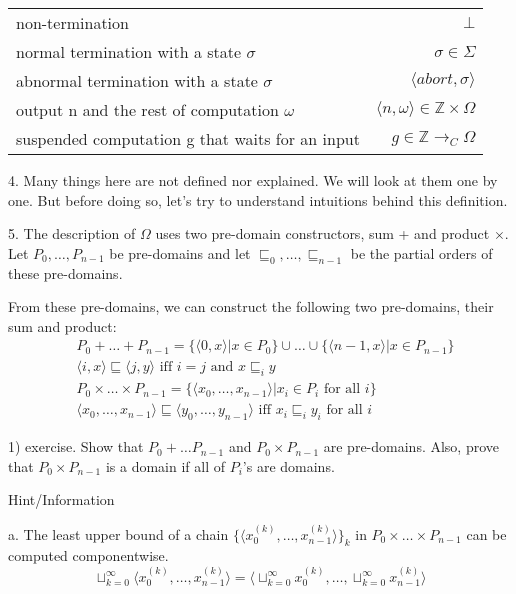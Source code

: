 \documentclass{report}[12pt]
\begin{document}
\begin{tabular}{l@{$\cdots$}r}
  non-termination & $\bot$ \\
  normal termination with a state $\sigma$  & $\sigma \in \Sigma$ \\
  abnormal termination with a state $\sigma$ & $\langle abort, \sigma \rangle$ \\
  output n and the rest of computation $\omega$ & $\langle n, \omega \rangle \in \mathbb{Z} \times \Omega$ \\
  suspended computation g that waits for an input & $g \in \mathbb{Z} \rightarrow_C \Omega$
\end{tabular}

4. Many things here are not defined nor explained. We will look at them one by one. But before doing so, let's try to understand intuitions behind this definition.

5. The description of $\Omega$ uses two pre-domain constructors, sum + and product $\times$. Let $P_0, \ldots, P_{n-1}$ be pre-domains and let $\sqsubseteq_0, \ldots, \sqsubseteq_{n-1}$ be the partial orders of these pre-domains.

From these pre-domains, we can construct the following two pre-domains, their sum and product:
\begin{align*}
  &P_0 + \ldots + P_{n-1} = \{\langle 0, x \rangle|x\in P_0\} \cup \ldots \cup \{\langle n-1, x \rangle | x \in P_{n-1}\} \\
  &\langle i, x \rangle \sqsubseteq \langle j, y \rangle \text{ iff }i=j \text{ and }x\sqsubseteq_i y \\
  &P_0 \times \ldots \times P_{n-1} = \{\langle x_0, \ldots, x_{n-1} \rangle | x_i \in P_i \text{ for all } i\} \\
  &\langle x_0, \ldots, x_{n-1} \rangle \sqsubseteq \langle y_0, \ldots, y_{n-1} \rangle \text{ iff }x_i \sqsubseteq_i y_i \text{ for all }i
\end{align*}

1) exercise. Show that $P_0 + \ldots P_{n-1}$ and $P_0 \times P_{n-1}$ are pre-domains. Also, prove that $P_0 \times P_{n-1}$ is a domain if all of $P_i$'s are domains.

Hint/Information

a. The least upper bound of a chain $\{\langle x_0^{(k)}, \ldots, x_{n-1}^{(k)} \rangle\}_k$ in $P_0 \times \ldots \times P_{n-1}$ can be computed componentwise.
\[\sqcup_{k=0}^\infty \langle x_0^{(k)} , \ldots, x_{n-1}^{(k)} \rangle = \langle \sqcup_{k=0}^\infty x_0^{(k)}, \ldots, \sqcup_{k=0}^\infty x_{n-1}^{(k)} \rangle\]
\end{document}
